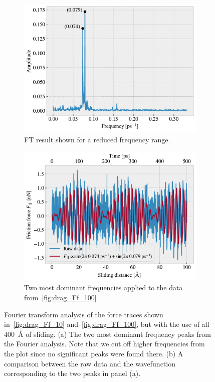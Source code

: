 \begin{figure}[!htb]
  \centering
  \begin{subfigure}[t]{0.49\textwidth}
    \centering
    \includegraphics[width=\textwidth]{figures/baseline/ft_zoom.pdf}
    \caption{FT result shown for a reduced frequency range.}
    \label{fig:ft_a}
  \end{subfigure}
  \hfill
  \begin{subfigure}[t]{0.49\textwidth}
      \centering
      \includegraphics[width=\textwidth]{figures/baseline/ft_sine.pdf}
      \caption{Two most dominant frequencies applied to the data from~\cref{fig:drag_Ff_100}}
      \label{fig:ft_b}
  \end{subfigure}
  \caption{Fourier transform analysis of the force traces shown in~\cref{fig:drag_Ff_10} and~\cref{fig:drag_Ff_100}, but with the use of all \SI{400}{Å} of sliding. (a) The two most dominant frequency peaks from the Fourier analysis. Note that we cut off higher frequencies from the plot since no significant peaks were found there. (b) A comparison between the raw data and the wavefunction corresponding to the two peaks in panel (a).}
  \label{fig:ft}
\end{figure}


